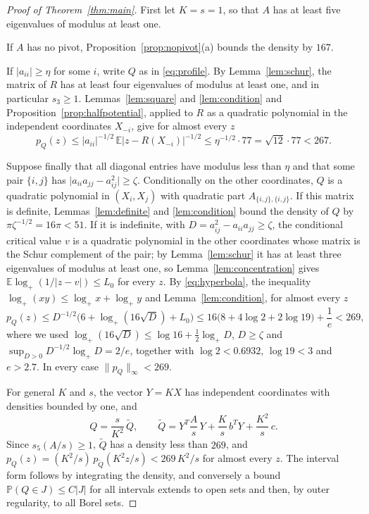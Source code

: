 \documentclass[11pt]{amsart}
\numberwithin{equation}{section}
\theoremstyle{definition}
\theoremstyle{remark}
\newcommand{\E}{\mathbb E}
\newcommand{\PP}{\mathbb P}
\newcommand{\1}{\mathbf 1}
\newcommand{\logp}{\log_+}
\newcommand{\norm}[1]{\lVert #1\rVert}
\newcommand{\abs}[1]{\lvert #1\rvert}
\begin{document}
\begin{proof}[Proof of Theorem~\ref{thm:main}]
First let $K=s=1$, so that $A$ has at least five eigenvalues of modulus at least one.

If $A$ has no pivot, Proposition~\ref{prop:nopivot}(a) bounds the density by $167$.

If $\abs{a_{ii}}\ge\eta$ for some $i$, write $Q$ as in \eqref{eq:profile}. By Lemma~\ref{lem:schur}, the matrix of $R$ has at least four eigenvalues of modulus at least one, and in particular $s_3\ge1$. Lemmas~\ref{lem:square} and \ref{lem:condition} and Proposition~\ref{prop:halfpotential}, applied to $R$ as a quadratic polynomial in the independent coordinates $X_{-i}$, give for almost every $z$
\[
p_Q(z)\le\abs{a_{ii}}^{-1/2}\,\E\abs{z-R(X_{-i})}^{-1/2}\le\eta^{-1/2}\cdot77=\sqrt{12}\cdot77<267 .
\]

Suppose finally that all diagonal entries have modulus less than $\eta$ and that some pair $\{i,j\}$ has $\abs{a_{ii}a_{jj}-a_{ij}^2}\ge\zeta$. Conditionally on the other coordinates, $Q$ is a quadratic polynomial in $(X_i,X_j)$ with quadratic part $A_{\{i,j\},\{i,j\}}$. If this matrix is definite, Lemmas~\ref{lem:definite} and \ref{lem:condition} bound the density of $Q$ by $\pi\zeta^{-1/2}=16\pi<51$. If it is indefinite, with $D=a_{ij}^2-a_{ii}a_{jj}\ge\zeta$, the conditional critical value $v$ is a quadratic polynomial in the other coordinates whose matrix is the Schur complement of the pair; by Lemma~\ref{lem:schur} it has at least three eigenvalues of modulus at least one, so Lemma~\ref{lem:concentration} gives $\E\logp(1/\abs{z-v})\le L_0$ for every $z$. By \eqref{eq:hyperbola}, the inequality $\logp(xy)\le\logp x+\logp y$ and Lemma~\ref{lem:condition}, for almost every $z$
\[
p_Q(z)\le D^{-1/2}\bigl(6+\logp(16\sqrt D)+L_0\bigr)\le16\bigl(8+4\log2+2\log19\bigr)+\frac1e<269,
\]
where we used $\logp(16\sqrt D)\le\log16+\frac12\logp D$, $D\ge\zeta$ and $\sup_{D>0}D^{-1/2}\logp D=2/e$, together with $\log2<0.6932$, $\log19<3$ and $e>2.7$. In every case $\norm{p_Q}_\infty<269$.

For general $K$ and $s$, the vector $Y=KX$ has independent coordinates with densities bounded by one, and
\[
Q=\frac s{K^2}\,\widetilde Q,\qquad\widetilde Q=Y^T\frac As\,Y+\frac Ks\,b^TY+\frac{K^2}s\,c .
\]
Since $s_5(A/s)\ge1$, $\widetilde Q$ has a density less than $269$, and $p_Q(z)=(K^2/s)\,p_{\widetilde Q}(K^2z/s)<269\,K^2/s$ for almost every $z$. The interval form follows by integrating the density, and conversely a bound $\PP(Q\in J)\le C\abs J$ for all intervals extends to open sets and then, by outer regularity, to all Borel sets.
\end{proof}
\end{document}
